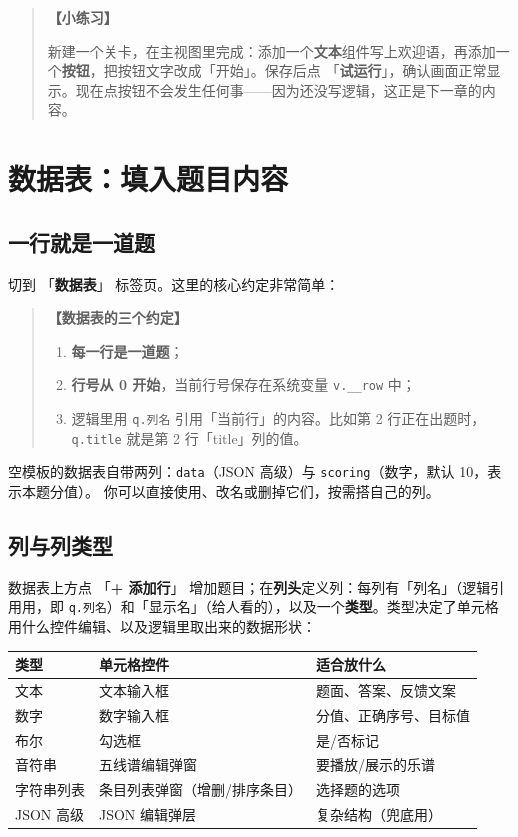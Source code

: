 \documentclass[UTF8,a4paper,zihao=-4]{ctexart}
\newcommand{\code}[1]{\texttt{#1}}   %
\newcommand{\ui}[1]{「\textbf{#1}」}  %
\newenvironment{tip}[1][提示]{%
  \begin{quote}\small\textbf{【#1】}\ignorespaces
}{\end{quote}}
\newenvironment{practice}{%
  \begin{quote}\small\textbf{【小练习】}\ignorespaces
}{\end{quote}}
\begin{document}
\begin{practice}
新建一个关卡，在主视图里完成：添加一个\textbf{文本}组件写上欢迎语，再添加一个\textbf{按钮}，把按钮文字改成「开始」。保存后点 \ui{试运行}，确认画面正常显示。现在点按钮不会发生任何事——因为还没写逻辑，这正是下一章的内容。
\end{practice}

\section{数据表：填入题目内容}

\subsection{一行就是一道题}

切到 \ui{数据表} 标签页。这里的核心约定非常简单：

\begin{tip}[数据表的三个约定]
\begin{enumerate}[nosep]
  \item \textbf{每一行是一道题}；
  \item \textbf{行号从 0 开始}，当前行号保存在系统变量 \code{v.\_\_row} 中；
  \item 逻辑里用 \code{q.列名} 引用「当前行」的内容。比如第 2 行正在出题时，\code{q.title} 就是第 2 行「title」列的值。
\end{enumerate}
\end{tip}

空模板的数据表自带两列：\code{data}（JSON 高级）与 \code{scoring}（数字，默认 10，表示本题分值）。
你可以直接使用、改名或删掉它们，按需搭自己的列。

\subsection{列与列类型}

数据表上方点 \ui{+ 添加行} 增加题目；在\textbf{列头}定义列：每列有「列名」（逻辑引用用，即 \code{q.列名}）和「显示名」（给人看的），以及一个\textbf{类型}。类型决定了单元格用什么控件编辑、以及逻辑里取出来的数据形状：

\begin{center}
\begin{tabular}{lll}
\toprule
类型 & 单元格控件 & 适合放什么 \\
\midrule
文本 & 文本输入框 & 题面、答案、反馈文案 \\
数字 & 数字输入框 & 分值、正确序号、目标值 \\
布尔 & 勾选框 & 是/否标记 \\
音符串 & 五线谱编辑弹窗 & 要播放/展示的乐谱 \\
字符串列表 & 条目列表弹窗（增删/排序条目） & 选择题的选项 \\
JSON 高级 & JSON 编辑弹层 & 复杂结构（兜底用） \\
\bottomrule
\end{tabular}
\end{center}
\end{document}
